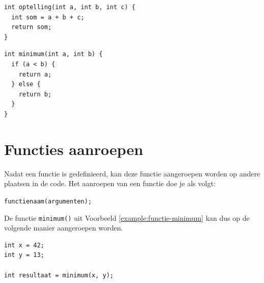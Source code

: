 \documentclass[11pt,fleqn]{book} %
\begin{document}
\begin{example}
	\phantom{ }
	\begin{verbatim}
int optelling(int a, int b, int c) {
  int som = a + b + c;
  return som;
}
	\end{verbatim}
\end{example}

\begin{example}
	\label{example:functie-minimum}
	\phantom{ }
	\begin{verbatim}
int minimum(int a, int b) {
  if (a < b) {
    return a;
  } else {
    return b;
  }
}
	\end{verbatim}
\end{example}

\section{Functies aanroepen}
Nadat een functie is gedefinieerd, kan deze functie aangeroepen worden op andere plaatsen in de code. Het aanroepen van een functie doe je als volgt:

\begin{center}
	\texttt{functienaam(argumenten);}
\end{center}
\noindent
De functie \texttt{minimum()} uit Voorbeeld \ref{example:functie-minimum} kan dus op de volgende manier aangeroepen worden. 

\begin{example}
	\phantom{ }
	\begin{verbatim}
int x = 42;
int y = 13;

int resultaat = minimum(x, y);
	\end{verbatim}
\end{example}

\end{document}
